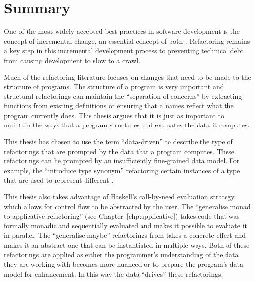 \section{Summary}

One of the most widely accepted best practices in software development is the concept of incremental change, an essential concept of both \DIFdelbegin {}\DIFdelend \DIFaddbegin {}\DIFaddend . Refactoring remains a key step in this incremental development process to preventing technical debt from causing development to slow to a crawl.

Much of the refactoring literature focuses on changes that need to be made to the structure of programs. The structure of a program is very important and structural refactorings can maintain the ``separation of concerns'' by extracting functions from existing definitions or ensuring that a \DIFdelbegin {}\DIFdelend \DIFaddbegin {}\DIFaddend names reflect what the program currently does. This thesis argues that it is just as important to maintain the ways that a program structures and evaluates the data it computes.

This thesis has chosen to use the term ``data-driven'' to describe the type of refactorings that are prompted by the data that a program computes. These refactorings can be prompted by an insufficiently fine-grained data model. For example, the ``introduce type synonym'' refactoring \DIFdelbegin {}\DIFdelend \DIFaddbegin {}\DIFaddend certain instances of a type that are used to represent different \DIFdelbegin {}\DIFdelend \DIFaddbegin {}\DIFaddend .

This thesis also takes advantage of Haskell's call-by-need evaluation strategy which allows for control flow to be abstracted by the user. The ``generalise monad to applicative refactoring'' (see Chapter~\ref{chp:applicative}) takes code that was formally monadic and sequentially evaluated and makes it possible to evaluate it in parallel. The ``generalise maybe'' refactorings from \DIFdelbegin {}\DIFdelend \DIFaddbegin {}\DIFaddend takes a concrete effect and makes it an abstract one that can be instantiated in multiple ways. Both of these refactorings are applied as either the programmer's understanding of the data they are working with becomes more nuanced or to prepare the program's data model for enhancement. In this way the data ``drives'' these refactorings.

